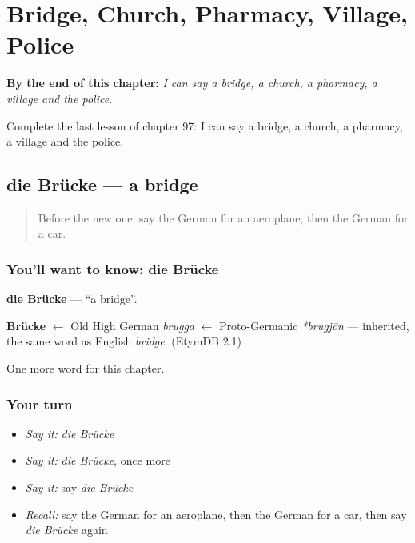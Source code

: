 
\chapter{Bridge, Church, Pharmacy, Village, Police}
\label{ch:ge-bridge-church-pharmacy-village-police}

\begin{chapteropening}
\textbf{By the end of this chapter:} \emph{I can say a bridge, a church, a pharmacy, a village and the police.}

Complete the last lesson of chapter 97: I can say a bridge, a church, a pharmacy, a village and the police.
\end{chapteropening}

\section[die Brücke]{die Brücke — a bridge}

\label{lesson:GE-C97-bruecke}



\begin{quote}
Before the new one: say the German for an aeroplane, then the German for a car.
\end{quote}

\subsection*{You'll want to know: die Brücke}
\textbf{die Brücke} — \textquotedblleft{}a bridge\textquotedblright{}.

\begin{cousinweb}
\textbf{Brücke} $\leftarrow$ Old High German \emph{brugga} $\leftarrow$ Proto-Germanic \emph{*brugjōn} — inherited, the same word as English \emph{bridge}. (EtymDB 2.1)
\end{cousinweb}

\begin{grammarlens}[title={What you've built}]
One more word for this chapter.
\end{grammarlens}

\subsection*{Your turn}
\begin{itemize}
\raggedright
  \item \emph{Say it:} \emph{die Brücke}
  \item \emph{Say it:} \emph{die Brücke}, once more
  \item \emph{Say it:} say \emph{die Brücke}
  \item \emph{Recall:} say the German for an aeroplane, then the German for a car, then say \emph{die Brücke} again
\end{itemize}

